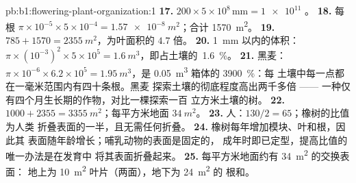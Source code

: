 \begin{solution}{pb:b1:flowering-plant-organization:1}
\textbf{17.} $200\times 5\times 10^8\,\mathrm{mm} = \num{1e11}$ 。
\textbf{18.} 每根 $\pi\times 10^{-5}\times 5\times 10^{-4} =
\qty{1.57e-8}{m^2}$；合计 \qty{1570}{m^2}。
\textbf{19.} $785 + 1570 = \qty{2355}{m^2}$，为叶面积的 $4.7$ 倍。
\textbf{20.} \qty{1}{mm} 以内的体积：$\pi\times(10^{-3})^2\times 5
\times 10^5 = \qty{1.6}{m^3}$，即占土壤的\ \qty{1.6}{\%}。
\textbf{21.} 黑麦：$\pi\times 10^{-6}\times 6.2\times 10^5 =
\qty{1.95}{m^3}$，是 \qty{0.05}{m^3} 箱体的 \qty{3900}{\%}：每
土壤中每一点都在一毫米范围内有四十条根。黑麦
探索土壤的彻底程度高出两千多倍 ——
一种仅有四个月生长期的作物，对比一棵探索一百
立方米土壤的树。
\textbf{22.} $1000 + 2355 = \qty{3355}{m^2}$；每平方米地面
$\qty{34}{m^2}$。
\textbf{23.} 人：$130/2 = 65$；橡树的比值为人类
折叠表面的一半，且无需任何折叠。
\textbf{24.} 橡树每年增加模块、叶和根，因此其
表面随年龄增长；哺乳动物的表面是固定的，
成年时即已定型，提高比值的唯一办法是在发育中
将其表面折叠起来。
\textbf{25.} 每平方米地面约有 \qty{34}{m^2} 的交换表面：
地上为 \qty{10}{m^2} 叶片（两面），地下为 \qty{24}{m^2} 的
根和。
\end{solution}

